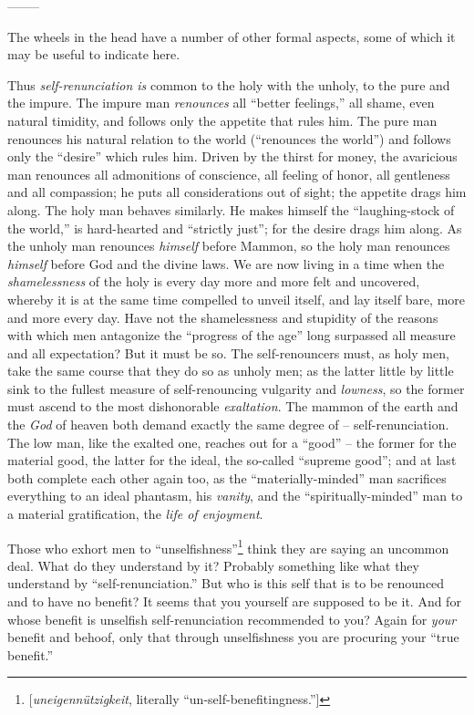 \begin{center}
--------\end{center}


The wheels in the head have a number of other formal aspects, some of which it 
may be useful to indicate here.

Thus \textit{self-renunciation is} common to the holy with the unholy, to the 
pure and the impure. The impure man \textit{renounces} all ``better 
feelings,'' all shame, even natural timidity, and follows only the appetite 
that rules him. The pure man renounces his natural relation to the world 
(``renounces the world'') and follows only the ``desire'' which rules him. 
Driven by the thirst for money, the avaricious man renounces all admonitions 
of conscience, all feeling of honor, all gentleness and all compassion; he 
puts all considerations out of sight; the appetite drags him along. The holy 
man behaves similarly. He makes himself the ``laughing-stock of the world,'' 
is hard-hearted and ``strictly just''; for the desire drags him along. As 
the unholy man renounces \textit{himself} before Mammon, so the holy man 
renounces \textit{himself} before God and the divine laws. We are now living 
in a time when the \textit{shamelessness} of the holy is every day more and 
more felt and uncovered, whereby it is at the same time compelled to unveil 
itself, and lay itself bare, more and more every day. Have not the 
shamelessness and stupidity of the reasons with which men antagonize the 
``progress of the age'' long surpassed all measure and all expectation? But 
it must be so. The self-renouncers must, as holy men, take the same course 
that they do so as unholy men; as the latter little by little sink to the 
fullest measure of self-renouncing vulgarity and \textit{lowness}, so the 
former must ascend to the most dishonorable \textit{exaltation}. The mammon of 
the earth and the \textit{God} of heaven both demand exactly the same degree 
of -- self-renunciation. The low man, like the exalted one, reaches out for a 
``good'' -- the former for the material good, the latter for the ideal, the 
so-called ``supreme good''; and at last both complete each other again too, 
as the ``materially-minded'' man sacrifices everything to an ideal phantasm, 
his \textit{vanity}, and the ``spiritually-minded'' man to a material 
gratification, the \textit{life of enjoyment}.

Those who exhort men to 
``unselfishness''\footnote{[\textit{uneigenn\"utzigkeit}, literally 
``un-self-benefitingness.'']} think they are saying an uncommon deal. What 
do they understand by it? Probably something like what they understand by 
``self-renunciation.'' But who is this self that is to be renounced and to 
have no benefit? It seems that you yourself are supposed to be it. And for 
whose benefit is unselfish self-renunciation recommended to you? Again for 
\textit{your} benefit and behoof, only that through unselfishness you are 
procuring your ``true benefit.''

